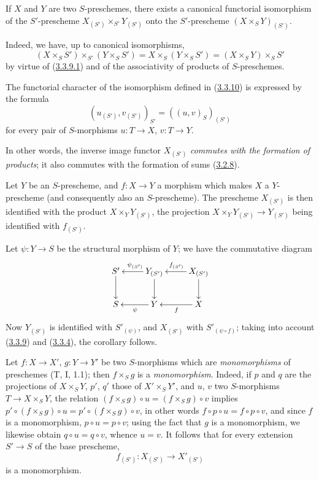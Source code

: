 \begin{corollary}[3.3.10]
\label{I.3.3.10}
If $X$ and $Y$ are two $S$-preschemes, there exists a canonical functorial
isomorphism of the $S'$-prescheme $X_{(S')}\times_{S'}Y_{(S')}$ onto the
$S'$-prescheme $(X\times_S Y)_{(S')}$.
\end{corollary}

Indeed, we have, up to canonical isomorphisms,
\[
  (X\times_S S')\times_{S'}(Y\times_S S')
  =X\times_S(Y\times_S S')=(X\times_S Y)\times_S S'
\]
by virtue of (\hyperref[I.3.3.9.1]{3.3.9.1}) and of the associativity of
products of $S$-preschemes.

The functorial character of the isomorphism defined in
(\hyperref[I.3.3.10]{3.3.10}) is expressed by the formula
\begin{equation}
  (u_{(S')},v_{(S')})_{S'}=((u,v)_S)_{(S')}
  \tag{3.3.10.1}\label{I.3.3.10.1}
\end{equation}
for every pair of $S$-morphisms $u:T\to X$, $v:T\to Y$.

In other words, the inverse image functor $X_{(S')}$
\emph{commutes with the formation of products}; it also commutes with the
formation of sums (\hyperref[I.3.2.8]{3.2.8}).

\begin{corollary}[3.3.11]
\label{I.3.3.11}
Let $Y$ be an $S$-prescheme, and $f:X\to Y$ a morphism which makes $X$ a
$Y$-prescheme (and consequently also an $S$-prescheme). The prescheme
$X_{(S')}$ is then identified with the product $X\times_Y Y_{(S')}$, the
projection $X\times_Y Y_{(S')}\to Y_{(S')}$ being identified with $f_{(S')}$.
\end{corollary}

Let $\psi:Y\to S$ be the structural morphism of $Y$; we have the commutative
diagram
\label{I.3.3.11.diagram}
\[
  \xymatrix{
    S'\ar[d] &
    Y_{(S')}\ar[l]_{\psi_{(S')}}\ar[d] &
    X_{(S')}\ar[l]_{f_{(S')}}\ar[d]\\
    S & Y\ar[l]^{\psi} & X\ar[l]^{f}
  }
\]
Now $Y_{(S')}$ is identified with $S'_{(\psi)}$, and $X_{(S')}$ with
$S'_{(\psi\circ f)}$; taking into account (\hyperref[I.3.3.9]{3.3.9}) and
(\hyperref[I.3.3.4]{3.3.4}), the corollary follows.

\begin{env}[3.3.12]
\label{I.3.3.12}
Let $f:X\to X'$, $g:Y\to Y'$ be two $S$-morphisms which are
\emph{monomorphisms} of preschemes (T, I, 1.1); then $f\times_S g$ is a
\emph{monomorphism}. Indeed, if $p$ and $q$ are the projections of
$X\times_S Y$, $p'$, $q'$ those of $X'\times_S Y'$, and $u$, $v$ two
$S$-morphisms $T\to X\times_S Y$, the relation
$(f\times_S g)\circ u=(f\times_S g)\circ v$ implies
$p'\circ(f\times_S g)\circ u=p'\circ(f\times_S g)\circ v$, in other words
$f\circ p\circ u=f\circ p\circ v$, and since $f$ is a monomorphism,
$p\circ u=p\circ v$; using the fact that $g$ is a monomorphism, we
likewise obtain $q\circ u=q\circ v$, whence $u=v$.
It follows that for every extension $S'\to S$ of the base prescheme,
\label{I.3.3.12.base-change-monomorphism}
\[
  f_{(S')}:X_{(S')}\to X'_{(S')}
\]
is a monomorphism.
\end{env}


